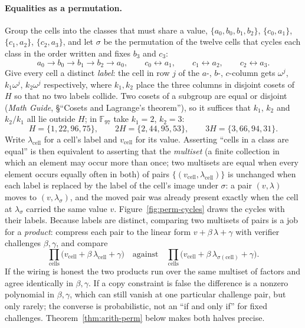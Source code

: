 \documentclass[11pt,a4paper]{article}
\theoremstyle{definition}
\newcommand{\F}{\mathbb{F}}
\begin{document}
\paragraph{Equalities as a permutation.}
Group the cells into the classes that must share a value,
$\{a_0, b_0, b_1, b_2\}$, $\{c_0, a_1\}$, $\{c_1, a_2\}$, $\{c_2, a_3\}$,
and let $\sigma$ be the permutation of the twelve cells that cycles each
class in the order written and fixes $b_3$ and $c_3$:
\[
a_0 \to b_0 \to b_1 \to b_2 \to a_0, \qquad
c_0 \leftrightarrow a_1, \qquad c_1 \leftrightarrow a_2, \qquad
c_2 \leftrightarrow a_3 .
\]
Give every cell a distinct \emph{label}: the cell in row $j$ of the $a$-,
$b$-, $c$-column gets $\omega^j$, $k_1\omega^j$, $k_2\omega^j$
respectively, where $k_1, k_2$ place the three columns in disjoint cosets
of $H$ so that no two labels collide. Two cosets of a subgroup are equal
or disjoint (\emph{Math Guide}, \S``Cosets and Lagrange's theorem''), so
it suffices that $k_1$, $k_2$ and $k_2/k_1$ all lie outside $H$; in
$\F_{97}$ take $k_1 = 2$, $k_2 = 3$:
\[
H = \{1, 22, 96, 75\}, \qquad 2H = \{2, 44, 95, 53\}, \qquad
3H = \{3, 66, 94, 31\}.
\]
Write $\lambda_{\mathrm{cell}}$ for a cell's label and $v_{\mathrm{cell}}$
for its value. Asserting ``cells in a class are equal'' is then
equivalent to asserting that the \emph{multiset} (a finite collection in
which an element may occur more than once; two multisets are equal when
every element occurs equally often in both) of pairs
$\{(v_{\mathrm{cell}}, \lambda_{\mathrm{cell}})\}$ is unchanged when each
label is replaced by the label of the cell's image under $\sigma$: a pair
$(v, \lambda)$ moves to $(v, \lambda_{\sigma})$, and the moved pair was already
present exactly when the cell at $\lambda_\sigma$ carried the same value $v$.
Figure~\ref{fig:perm-cycles} draws the cycles with their labels. Because
labels are distinct, comparing two multisets of pairs is a job for a
\emph{product}: compress each pair to the linear form
$v + \beta\,\lambda + \gamma$ with verifier challenges $\beta, \gamma$, and
compare
\begin{equation}\label{eq:arith-perm-product}
\prod_{\text{cells}} \bigl(v_{\mathrm{cell}} + \beta\,\lambda_{\mathrm{cell}}
  + \gamma\bigr)
\quad\text{against}\quad
\prod_{\text{cells}} \bigl(v_{\mathrm{cell}}
  + \beta\,\lambda_{\sigma(\mathrm{cell})} + \gamma\bigr).
\end{equation}
If the wiring is honest the two products run over the same multiset of
factors and agree identically in $\beta, \gamma$. If a copy constraint is
false the difference is a nonzero polynomial in $\beta, \gamma$, which can
still vanish at one particular challenge pair, but only rarely; the
converse is probabilistic, not an ``if and only if'' for fixed challenges.
Theorem~\ref{thm:arith-perm} below makes both halves precise.
\end{document}
